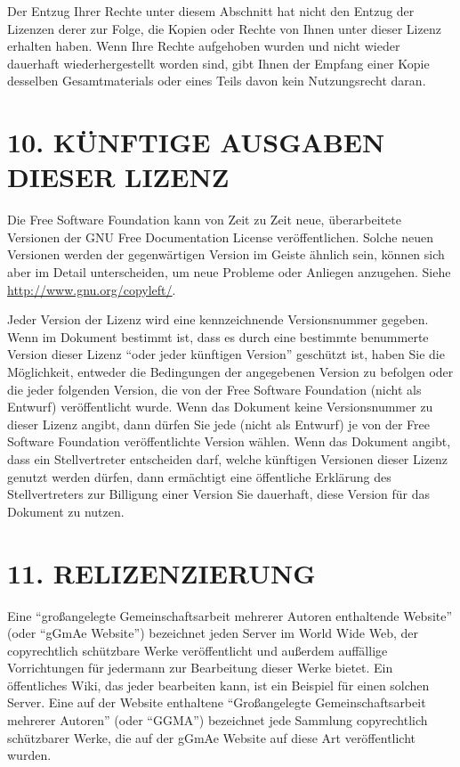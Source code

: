 Der Entzug Ihrer Rechte unter diesem Abschnitt hat nicht den Entzug der Lizenzen
derer zur Folge, die Kopien oder Rechte von Ihnen unter dieser Lizenz erhalten haben. 
Wenn Ihre Rechte aufgehoben wurden und nicht wieder dauerhaft wiederhergestellt worden sind,
gibt Ihnen der Empfang einer Kopie desselben Gesamtmaterials oder eines Teils davon 
kein Nutzungsrecht daran.

\section*{10. KÜNFTIGE AUSGABEN DIESER LIZENZ}

Die Free Software Foundation kann von Zeit zu Zeit neue, überarbeitete Versionen 
der GNU Free Documentation License veröffentlichen. Solche neuen Versionen werden
der gegenwärtigen Version im Geiste ähnlich sein, können sich aber
im Detail unterscheiden, um neue Probleme oder Anliegen anzugehen. Siehe
\url{http://www.gnu.org/copyleft/}.

Jeder Version der Lizenz wird eine kennzeichnende Versionsnummer gegeben.
Wenn im Dokument bestimmt ist, dass es durch eine bestimmte benummerte Version dieser
Lizenz "`oder jeder künftigen Version"' geschützt ist, haben Sie die Möglichkeit,
entweder die Bedingungen der angegebenen Version zu befolgen oder die jeder
folgenden Version, die von der Free Software Foundation (nicht als Entwurf)
veröffentlicht wurde. Wenn das Dokument keine Versionsnummer zu dieser Lizenz
angibt, dann dürfen Sie jede (nicht als Entwurf) je von der Free Software Foundation 
veröffentlichte Version wählen. Wenn das Dokument angibt, dass ein Stellvertreter
entscheiden darf, welche künftigen Versionen dieser Lizenz genutzt werden dürfen, 
dann ermächtigt eine öffentliche Erklärung des Stellvertreters zur Billigung einer
Version Sie dauerhaft, diese Version für das Dokument zu nutzen.

\section*{11. RELIZENZIERUNG}

Eine "`großangelegte Gemeinschaftsarbeit mehrerer Autoren enthaltende Website"' 
(oder "`gGmAe Website"') bezeichnet jeden
Server im World Wide Web, der copyrechtlich schützbare Werke veröffentlicht
und außerdem auffällige Vorrichtungen für jedermann zur Bearbeitung dieser Werke bietet. Ein öffentliches
Wiki, das jeder bearbeiten kann, ist ein Beispiel für einen solchen Server.
Eine auf der Website enthaltene "`Großangelegte Gemeinschaftsarbeit mehrerer Autoren"' (oder "`GGMA"')
bezeichnet jede Sammlung copyrechtlich schützbarer Werke, die auf der gGmAe Website auf
diese Art veröffentlicht wurden.


